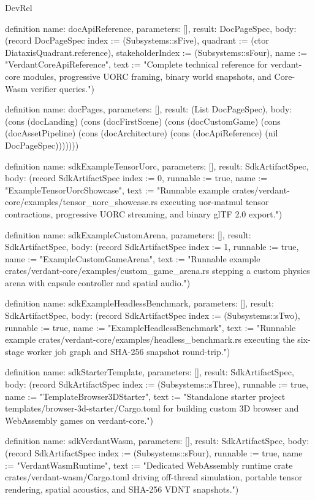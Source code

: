 \begin{lexlean}{DevRel}
\begin{semanticmodule}
definition{
  name: docApiReference,
  parameters: [],
  result: DocPageSpec,
  body: (record DocPageSpec {index := (Subsystems::sFive), quadrant := (ctor DiataxisQuadrant.reference), stakeholderIndex := (Subsystems::sFour), name := "VerdantCoreApiReference", text := "Complete technical reference for verdant-core modules, progressive UORC framing, binary world snapshots, and Core-Wasm verifier queries."})
}

definition{
  name: docPages,
  parameters: [],
  result: (List DocPageSpec),
  body: (cons (docLanding) (cons (docFirstScene) (cons (docCustomGame) (cons (docAssetPipeline) (cons (docArchitecture) (cons (docApiReference) (nil DocPageSpec)))))))
}

definition{
  name: sdkExampleTensorUorc,
  parameters: [],
  result: SdkArtifactSpec,
  body: (record SdkArtifactSpec {index := 0, runnable := true, name := "ExampleTensorUorcShowcase", text := "Runnable example crates/verdant-core/examples/tensor_uorc_showcase.rs executing uor-matmul tensor contractions, progressive UORC streaming, and binary glTF 2.0 export."})
}

definition{
  name: sdkExampleCustomArena,
  parameters: [],
  result: SdkArtifactSpec,
  body: (record SdkArtifactSpec {index := 1, runnable := true, name := "ExampleCustomGameArena", text := "Runnable example crates/verdant-core/examples/custom_game_arena.rs stepping a custom physics arena with capsule controller and spatial audio."})
}

definition{
  name: sdkExampleHeadlessBenchmark,
  parameters: [],
  result: SdkArtifactSpec,
  body: (record SdkArtifactSpec {index := (Subsystems::sTwo), runnable := true, name := "ExampleHeadlessBenchmark", text := "Runnable example crates/verdant-core/examples/headless_benchmark.rs executing the six-stage worker job graph and SHA-256 snapshot round-trip."})
}

definition{
  name: sdkStarterTemplate,
  parameters: [],
  result: SdkArtifactSpec,
  body: (record SdkArtifactSpec {index := (Subsystems::sThree), runnable := true, name := "TemplateBrowser3DStarter", text := "Standalone starter project templates/browser-3d-starter/Cargo.toml for building custom 3D browser and WebAssembly games on verdant-core."})
}

definition{
  name: sdkVerdantWasm,
  parameters: [],
  result: SdkArtifactSpec,
  body: (record SdkArtifactSpec {index := (Subsystems::sFour), runnable := true, name := "VerdantWasmRuntime", text := "Dedicated WebAssembly runtime crate crates/verdant-wasm/Cargo.toml driving off-thread simulation, portable tensor rendering, spatial acoustics, and SHA-256 VDNT snapshots."})
}


\end{semanticmodule}
\end{lexlean}
